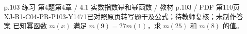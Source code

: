 \par\noindent\begin{minipage}{\linewidth}
\begin{bankitem}{p.103 练习 第4题}{第4章 / 4.1 实数指数幂和幂函数 / 教材 p.103 / PDF 第110页}{XJ-B1-C04-PR-P103-Y1471}{已对照原页转写题干及公式；待教师复核；未制作答案}
已知幂函数 $m(x)$ 满足 $m(9)=27m(1)$，求 $m(25)$ 和 $m(8)$ 的值。
\end{bankitem}
\end{minipage}\par\medskip
